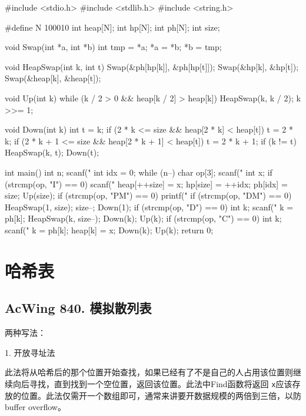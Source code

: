 \begin{mycpptwocol}[可修改任意元素的堆]
#include <stdio.h>
#include <stdlib.h>
#include <string.h>

#define N 100010
int heap[N];
int hp[N];
int ph[N];
int size;

void Swap(int *a, int *b)
{
    int tmp = *a;
    *a = *b;
    *b = tmp;
}

void HeapSwap(int k, int t)
{
    Swap(&ph[hp[k]], &ph[hp[t]]);
    Swap(&hp[k], &hp[t]);
    Swap(&heap[k], &heap[t]);
}

void Up(int k)
{
    while (k / 2 > 0 && heap[k / 2] > heap[k]) {
        HeapSwap(k, k / 2);
        k >>= 1;
    }
}

void Down(int k)
{
    int t = k;
    if (2 * k <= size && heap[2 * k] < heap[t]) {
        t = 2 * k;
    }
    if (2 * k + 1 <= size && heap[2 * k + 1] < heap[t]) {
        t = 2 * k + 1;
    }
    if (k != t) {
        HeapSwap(k, t);
        Down(t);
    }
}

int main()
{
    int n;
    scanf("%
    int idx = 0;
    while (n--) {
        char op[3];
        scanf("%
        int x;
        if (strcmp(op, "I") == 0) {
            scanf("%
            heap[++size] = x;
            hp[size] = ++idx;
            ph[idx] = size;
            Up(size);
        }
        if (strcmp(op, "PM") == 0) {
            printf("%
        }
        if (strcmp(op, "DM") == 0) {
            HeapSwap(1, size);
            size--;
            Down(1);
        }
        if (strcmp(op, "D") == 0) {
            int k;
            scanf("%
            k = ph[k];
            HeapSwap(k, size--);
            Down(k);
            Up(k);
        }
        if (strcmp(op, "C") == 0) {
            int k;
            scanf("%
            k = ph[k];
            heap[k] = x;
            Down(k);
            Up(k);
        }
    }
    return 0;
}
\end{mycpptwocol}

\section{哈希表}
\subsection{AcWing 840. 模拟散列表}

两种写法：

1. 开放寻址法

此法将从哈希后的那个位置开始查找，如果已经有了不是自己的人占用该位置则继续向后寻找，直到找到一个空位置，返回该位置。此法中Find函数将返回 \lstinline{x}应该存放的位置。此法仅需开一个数组即可，通常来讲要开数据规模的两倍到三倍，以防buffer overflow。

